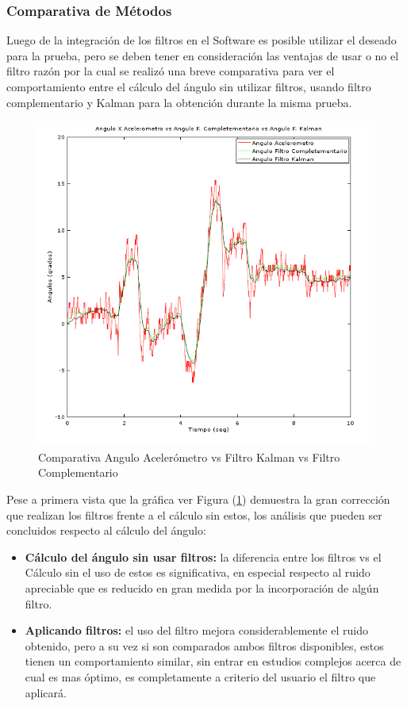 \documentclass[12pt,a4paper]{article}
\begin{document}
\subsubsection{Comparativa de Métodos}
Luego de la integración de los filtros en el Software es posible utilizar el deseado para la prueba, pero se deben tener en consideración las ventajas de usar o no el filtro razón por la cual se realizó una breve comparativa para ver el comportamiento entre el cálculo del ángulo sin utilizar filtros, usando filtro complementario y Kalman para la obtención durante la misma prueba.

\begin{figure}[H]
	\centering
	\includegraphics[scale=0.75]{images/angKalCom}
	\caption{Comparativa Angulo Acelerómetro vs Filtro Kalman vs Filtro Complementario}
	\label{fig:AnguloXvsFiltros}
\end{figure}

Pese a primera vista que la gráfica ver Figura (\ref{fig:AnguloXvsFiltros}) demuestra la gran corrección que realizan los filtros frente a el cálculo sin estos, los análisis que pueden ser concluidos respecto al cálculo del ángulo:
\begin{itemize}
	\item \textbf{Cálculo del ángulo sin usar filtros:} la diferencia entre los filtros vs el Cálculo sin el uso de estos es significativa, en especial respecto al ruido apreciable que es reducido en gran medida por la incorporación de algún filtro.
	\item \textbf{Aplicando filtros:} el uso del filtro mejora considerablemente el ruido obtenido, pero a su vez si son comparados ambos filtros disponibles, estos tienen un comportamiento similar, sin entrar en estudios complejos acerca de cual es mas óptimo, es completamente a criterio del usuario el filtro que aplicará.
\end{itemize}
\end{document}
